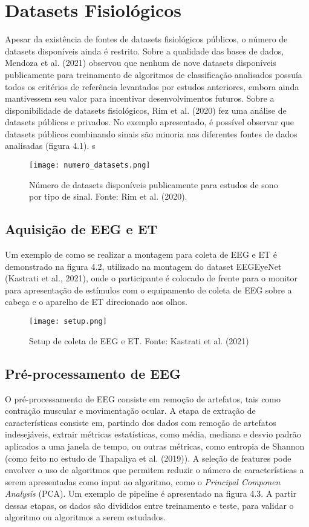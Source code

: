 \chapter{Datasets Fisiológicos}


Apesar da existência de fontes de datasets fisiológicos públicos, 
o número de datasets disponíveis ainda é restrito. Sobre a qualidade das bases de dados, 
Mendoza et al. (2021) observou que nenhum de nove datasets disponíveis publicamente para 
treinamento de algoritmos de classificação analisados possuía 
todos os critérios de referência levantados por estudos anteriores, embora ainda mantivessem seu valor
para incentivar desenvolvimentos futuros.
Sobre a disponibilidade de datasets fisiológicos,
Rim et al. (2020) fez uma análise de datasets públicos e privados. 
No exemplo apresentado, 
é possível observar que datasets públicos combinando sinais são minoria nas diferentes fontes de dados analisadas
(figura 4.1).
s
\begin{figure}[!h]
      \centering
      \texttt{[image: numero\_datasets.png]}
      \caption{Número de datasets disponíveis publicamente para estudos de sono por tipo de sinal. Fonte: Rim et al. (2020). }
\end{figure}

\section{Aquisição de EEG e ET}

Um exemplo de como se realizar a montagem para coleta de EEG e ET é demonstrado na figura 4.2, 
utilizado na montagem do dataset EEGEyeNet (Kastrati et al., 2021),
onde o participante é colocado de frente para o monitor para apresentação de estímulos com o 
equipamento de coleta de EEG sobre a cabeça e o aparelho de ET direcionado aos olhos. 


\begin{figure}[h]
      \centering
      \texttt{[image: setup.png]}
      \caption{Setup de coleta de EEG e ET. Fonte: Kastrati et al. (2021)}
\end{figure}



\section{Pré-processamento de EEG}
O pré-processamento de EEG consiste em remoção de artefatos, 
tais como contração muscular e movimentação ocular.
A etapa de extração de características consiste em, partindo dos dados com 
remoção de artefatos indesejáveis, extrair métricas estatísticas, como média, 
mediana e desvio padrão aplicados a uma janela de tempo, ou outras métricas, como entropia de Shannon 
(como feito no estudo de Thapaliya et al. (2019)). A seleção de features pode 
envolver o uso de algoritmos que permitem reduzir o número de características a 
serem apresentadas como input ao algoritmo, como o \textit{Principal Componen Analysis} (PCA).
 Um exemplo de pipeline é apresentado na figura 4.3. A partir dessas etapas, os dados são divididos entre treinamento e 
 teste, para validar o algoritmo ou algoritmos a serem estudados. 

